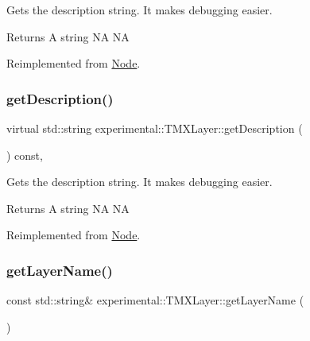 Gets the description string. It makes debugging easier. \begin{DoxyReturn}{Returns}
A string  NA  NA 
\end{DoxyReturn}


Reimplemented from \hyperlink{classNode_a41710375a0d92a4ee54c39fe123b5912}{Node}.

\mbox{\label{classexperimental_1_1TMXLayer_a5d2c509af2c8beec8b9e52ca6fad0b91}} 
\subsubsection{\texorpdfstring{get\+Description()}{getDescription()}\hspace{0.1cm}{\footnotesize\ttfamily [2/2]}}
{\footnotesize\ttfamily virtual std\+::string experimental\+::\+T\+M\+X\+Layer\+::get\+Description (\begin{DoxyParamCaption}{ }\end{DoxyParamCaption}) const\hspace{0.3cm}{\ttfamily [override]}, {\ttfamily [virtual]}}

Gets the description string. It makes debugging easier. \begin{DoxyReturn}{Returns}
A string  NA  NA 
\end{DoxyReturn}


Reimplemented from \hyperlink{classNode_a41710375a0d92a4ee54c39fe123b5912}{Node}.

\mbox{\label{classexperimental_1_1TMXLayer_ae990c2f9653649658ae009cd6b75c8d8}} 
\subsubsection{\texorpdfstring{get\+Layer\+Name()}{getLayerName()}\hspace{0.1cm}{\footnotesize\ttfamily [1/2]}}
{\footnotesize\ttfamily const std\+::string\& experimental\+::\+T\+M\+X\+Layer\+::get\+Layer\+Name (\begin{DoxyParamCaption}{ }\end{DoxyParamCaption})\hspace{0.3cm}{\ttfamily [inline]}}

